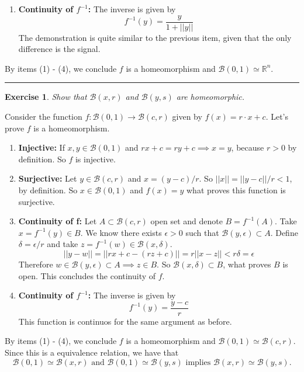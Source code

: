 \documentclass[a4paper,11pt]{article}
\newcommand{\linia}{\rule{\linewidth}{0.5pt}}
\theoremstyle{mytheor}
\theoremstyle{mytheor}
\newtheorem{exercise}{Exercise}
\theoremstyle{remark}
\newcommand{\B}{\mathcal{B}}
\newcommand{\R}{\mathbb{R}}
\begin{document}
\begin{enumerate}
    \item \textbf{Continuity of $f^{-1}$: } The inverse is given by 
    $$
    f^{-1}(y) = \frac{y}{1 + ||y||}
    $$
    The demonstration is quite similar to the previous item, given that the
    only difference is the signal. 
\end{enumerate}

By items (1) - (4), we conclude $f$ is a homeomorphism and $\B(0,1) \simeq
\R^n$. 

\noindent\linia

\begin{exercise}
    Show that $\B(x, r)$ and $\B(y, s)$ are homeomorphic.
\end{exercise}

Consider the function $f: \B(0, 1) \to \B(c, r)$ given by $f(x) = r\cdot x + c$. Let's
prove $f$ is a homeomorphism. 
\begin{enumerate}
    \item \textbf{Injective:} If $x,y \in \B(0,1)$ and $rx + c = ry + c
    \implies x = y$, because $r > 0$ by 
    definition. So $f$ is injective. 
    
    \item \textbf{Surjective:}  Let $y \in \B(c, r)$ and $x = (y - c)/r$. So
    $||x|| = ||y - c||/r < 1$, by definition. So $x \in \B(0,1)$ and $f(x) =
    y$ what proves this function is surjective. 

    \item \textbf{Continuity of f:} Let $A \subset \B(c,r)$ open set and
    denote $B = f^{-1}(A)$. Take $x = f^{-1}(y) \in B$. We know there exists
    $\epsilon > 0$ such that $\B(y, \epsilon) \subset A$. Define $\delta = \epsilon/r$ and
    take $z = f^{-1}(w) \in \B(x,\delta)$. 
    $$
    ||y-w|| = ||rx + c - (rz + c)|| = r||x - z|| < r\delta = \epsilon 
    $$
    Therefore $w \in \B(y, \epsilon) \subset A \implies z \in B$. So
    $\B(x,\delta) \subset B$, what proves $B$ is open. This concludes the
    continuity of $f$. 
    
    \item \textbf{Continuity of $f^{-1}$:} The inverse is given by 
    $$
    f^{-1}(y) = \frac{y - c}{r}
    $$
    This function is continuos for the same argument as before. 
\end{enumerate}

By items (1) - (4), we conclude $f$ is a homeomorphism and $\B(0,1) \simeq
\B(c,r)$. Since this is a equivalence relation, we have that
$$
\B(0,1) \simeq \B(x,r) \text{ and } \B(0,1) \simeq \B(y, s) \text{ implies } \B(x,r) \simeq \B(y,s).
$$
\end{document}
